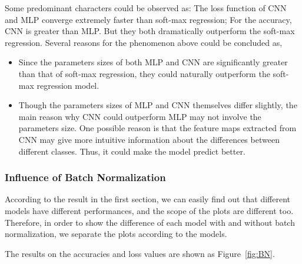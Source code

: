 \documentclass[12pt,letterpaper]{article}
\begin{document}
Some predominant characters could be observed as: The loss function of CNN and MLP converge extremely faster than soft-max regression; For the accuracy, CNN is greater than MLP. But they both dramatically outperform the soft-max regression. Several reasons for the phenomenon above could be concluded as,
\begin{itemize}
    \item Since the parameters sizes of both MLP and CNN are significantly greater than that of soft-max regression, they could naturally outperform the soft-max regression model.
    \item Though the parameters sizes of MLP and CNN themselves differ slightly, the main reason why CNN could outperform MLP may not involve the parameters size. One possible reason is that the feature maps extracted from CNN may give more intuitive information about the differences between different classes. Thus, it could make the model predict better.
\end{itemize}

\subsubsection{Influence of Batch Normalization}

According to the result in the first section, we can easily find out that different models have different performances, and the scope of the plots are different too. Therefore, in order to show the difference of each model with and without batch normalization, we separate the plots according to the models.

The results on the accuracies and loss values are shown as Figure~\ref{fig:BN}.
\end{document}
